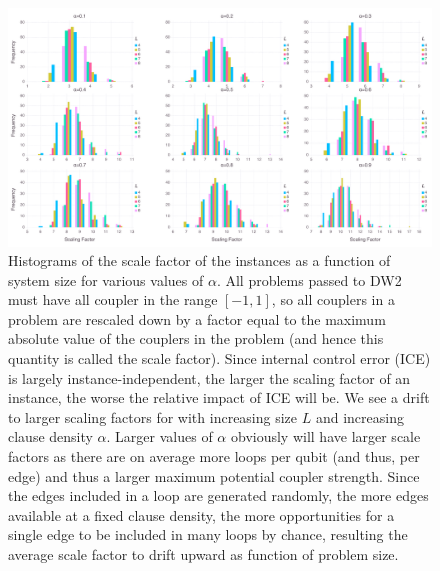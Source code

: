 \begin{figure}[t]
\begin{center}
\includegraphics[width=\textwidth]{chapters/Planted/precision_histogram}
\caption{
Histograms of the scale factor of the instances as a function of system size for various values of $\alpha$. All problems passed to DW2 must have all coupler in the range $[-1,1]$, so all couplers in a problem are rescaled down by a factor equal to the maximum absolute value of the couplers in the problem (and hence this quantity is called the scale factor). Since internal control error (ICE) is largely instance-independent, the larger the scaling factor of an instance, the worse the relative impact of ICE will be. We see a drift to larger scaling factors for with increasing size $L$ and increasing clause density $\alpha$. Larger values of $\alpha$ obviously will have larger scale factors as there are on average more loops per qubit (and thus, per edge) and thus a larger maximum potential coupler strength. Since the edges included in a loop are generated randomly, the more edges available at a fixed clause density, the more opportunities for a single edge to be included in many loops by chance, resulting the average scale factor to drift upward as function of problem size.
}
\label{fig:precision_planted}
\end{center}
\end{figure}


%
%

